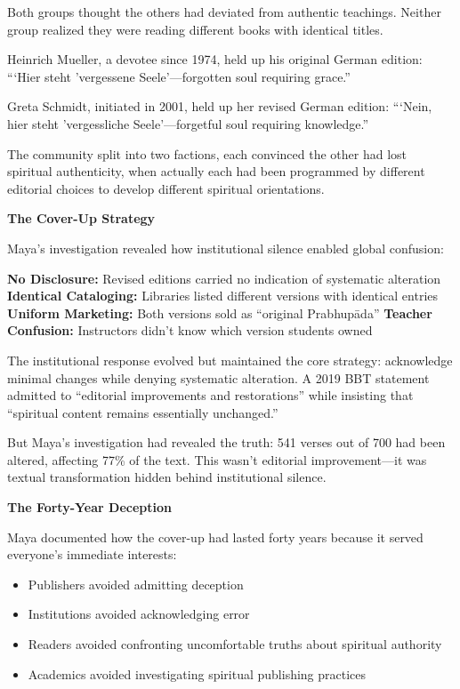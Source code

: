 \documentclass[11pt,twoside]{book}
\begin{document}
Both groups thought the others had deviated from authentic teachings. Neither group realized they were reading different books with identical titles.

Heinrich Mueller, a devotee since 1974, held up his original German edition: ```Hier steht 'vergessene Seele'—forgotten soul requiring grace.''

Greta Schmidt, initiated in 2001, held up her revised German edition: ```Nein, hier steht 'vergessliche Seele'—forgetful soul requiring knowledge.''

The community split into two factions, each convinced the other had lost spiritual authenticity, when actually each had been programmed by different editorial choices to develop different spiritual orientations.

\textbf{The Cover-Up Strategy}

Maya's investigation revealed how institutional silence enabled global confusion:

\textbf{No Disclosure:} Revised editions carried no indication of systematic alteration
\textbf{Identical Cataloging:} Libraries listed different versions with identical entries
\textbf{Uniform Marketing:} Both versions sold as ``original Prabhupāda''
\textbf{Teacher Confusion:} Instructors didn't know which version students owned

The institutional response evolved but maintained the core strategy: acknowledge minimal changes while denying systematic alteration. A 2019 BBT statement admitted to ``editorial improvements and restorations'' while insisting that ``spiritual content remains essentially unchanged.''

But Maya's investigation had revealed the truth: 541 verses out of 700 had been altered, affecting 77\% of the text. This wasn't editorial improvement—it was textual transformation hidden behind institutional silence.

\textbf{The Forty-Year Deception}

Maya documented how the cover-up had lasted forty years because it served everyone's immediate interests:
\begin{itemize}
\item Publishers avoided admitting deception
\item Institutions avoided acknowledging error  
\item Readers avoided confronting uncomfortable truths about spiritual authority
\item Academics avoided investigating spiritual publishing practices
\end{itemize}
\end{document}
